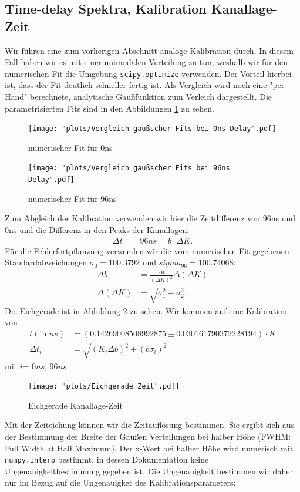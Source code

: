 \documentclass[%
aps,
onecolumn,
11pt,
tightenlines,
nofootinbib,
superscriptaddress,
floatfix,
prd,
]{revtex4-2}
\begin{document}
\subsection{Time-delay Spektra, Kalibration Kanallage-Zeit}
Wir führen eine zum vorherigen Abschnitt analoge Kalibration durch. In diesem Fall haben wir es mit einer unimodalen Verteilung zu tun, weshalb wir für den numerischen Fit die Umgebung \texttt{scipy.optimize} verwenden. Der Vorteil hierbei ist, dass der Fit deutlich schneller fertig ist. Als Vergleich wird noch eine "per Hand" berechnete, analytische Gaußfunktion zum Verleich dargestellt. Die parametrisierten Fits sind in den Abbildungen \ref{fig:timedelay} zu sehen. 
\begin{figure}[H]
	\centering
	\texttt{[image: "plots/Vergleich gaußscher Fits bei 0ns Delay".pdf]}
	\caption{numerischer Fit für 0ns}
	\label{fig:timedelay}
\end{figure}
\begin{figure}[H]
	\centering
	\texttt{[image: "plots/Vergleich gaußscher Fits bei 96ns Delay".pdf]}
	\caption{numerischer Fit für 96ns}
\end{figure}
Zum Abgleich der Kalibration verwenden wir hier die Zeitdifferenz von 96ns und 0ns und die Differenz in den Peaks der Kanallagen:
\begin{align}
	\Delta t &= 96ns = b \cdot \Delta K. 
\end{align}
Für die Fehlerfortpflanzung verwenden wir die vom numerischen Fit gegebenen Standardabweichungen $\sigma_{0}=$100.3792 und $sigma_{96}= 100.74068$:
\begin{align}
    \Delta b &= \frac{\Delta t}{(\Delta K)^2} \Delta(\Delta K) \\
    \Delta (\Delta K) &= \sqrt{ \sigma_1^2 + \sigma_2^2 }.
\end{align}
Die Eichgerade ist in Abbildung \ref{fig:timecalibrate} zu sehen. Wir kommen auf eine Kalibration von
\begin{align}
	t (\text{in $ns$})&= (0.14269008508992875 \pm 0.030161790372228194) \cdot K \\
	\Delta t_{i} &= \sqrt{ (K_i \Delta b)^2 + (b \sigma_i)^2 }
\end{align}
mit $i $= 0$ns$, 96$ns$.
\begin{figure}[H]
	\centering
	\texttt{[image: "plots/Eichgerade Zeit".pdf]}
	\caption{Eichgerade Kanallage-Zeit}
	\label{fig:timecalibrate}
\end{figure}
		Mit der Zeiteichung können wir die Zeitauflösung bestimmen. Sie ergibt sich aus der Bestimmung der Breite der Gaußen Verteilungen bei halber Höhe (FWHM: Full Width at Half Maximum). Der x-Wert bei halber Höhe wird numerisch mit \texttt{numpy.interp} bestimmt, in dessen Dokumentation keine Ungenauigkeitbestimmung gegeben ist. Die Ungenauigkeit bestimmen wir daher nur im Bezug auf die Ungenauigket des Kalibrationsparameters:
\end{document}
